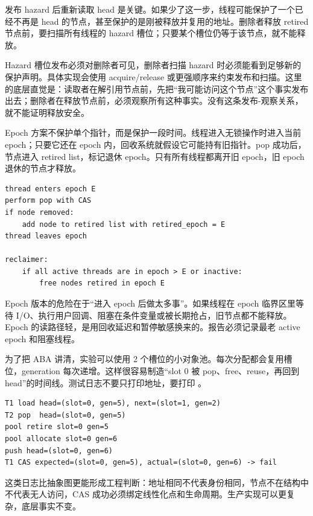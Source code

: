 发布 hazard 后重新读取 head 是关键。如果少了这一步，线程可能保护了一个已经不再是 head 的节点，甚至保护的是刚被释放并复用的地址。删除者释放 retired 节点前，要扫描所有线程的 hazard 槽位；只要某个槽位仍等于该节点，就不能释放。

Hazard 槽位发布必须对删除者可见，删除者扫描 hazard 时必须能看到足够新的保护声明。具体实现会使用 acquire/release 或更强顺序来约束发布和扫描。这里的底层直觉是：读取者在解引用节点前，先把“我可能访问这个节点”这个事实发布出去；删除者在释放节点前，必须观察所有这种事实。没有这条发布-观察关系，就不能证明释放安全。

Epoch 方案不保护单个指针，而是保护一段时间。线程进入无锁操作时进入当前 epoch；只要它还在 epoch 内，回收系统就假设它可能持有旧指针。pop 成功后，节点进入 retired list，标记退休 epoch。只有所有线程都离开旧 epoch，旧 epoch 退休的节点才释放。

\begin{lstlisting}[numbers=none,caption={Epoch 回收的语义伪代码}]
thread enters epoch E
perform pop with CAS
if node removed:
    add node to retired list with retired_epoch = E
thread leaves epoch

reclaimer:
    if all active threads are in epoch > E or inactive:
        free nodes retired in epoch E
\end{lstlisting}

Epoch 版本的危险在于“进入 epoch 后做太多事”。如果线程在 epoch 临界区里等待 I/O、执行用户回调、阻塞在条件变量或被长期抢占，旧节点都不能释放。Epoch 的读路径轻，是用回收延迟和暂停敏感换来的。报告必须记录最老 active epoch 和阻塞线程。

为了把 ABA 讲清，实验可以使用 2 个槽位的小对象池。每次分配都会复用槽位，generation 每次递增。这样很容易制造“slot 0 被 pop、free、reuse，再回到 head”的时间线。测试日志不要只打印地址，要打印 。

\begin{lstlisting}[numbers=none,caption={ABA 可视化日志示例}]
T1 load head=(slot=0, gen=5), next=(slot=1, gen=2)
T2 pop  head=(slot=0, gen=5)
pool retire slot=0 gen=5
pool allocate slot=0 gen=6
push head=(slot=0, gen=6)
T1 CAS expected=(slot=0, gen=5), actual=(slot=0, gen=6) -> fail
\end{lstlisting}

这类日志比抽象图更能形成工程判断：地址相同不代表身份相同，节点不在结构中不代表无人访问，CAS 成功必须绑定线性化点和生命周期。生产实现可以更复杂，底层事实不变。

